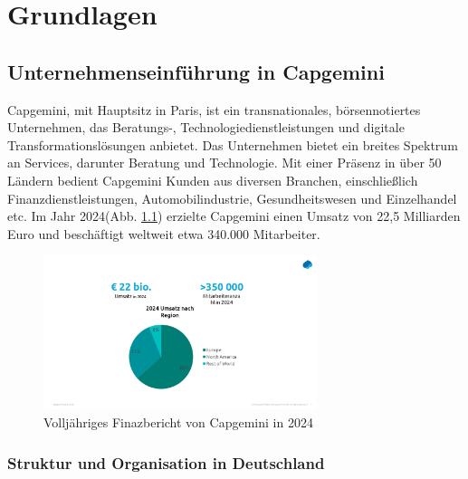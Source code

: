 \chapter{Grundlagen}
\section{Unternehmenseinführung in Capgemini} %
Capgemini, mit Hauptsitz in Paris, ist ein transnationales, börsennotiertes Unternehmen, das Beratungs-, Technologiedienstleistungen und digitale Transformationslösungen anbietet. Das Unternehmen bietet ein breites Spektrum an Services, darunter Beratung und Technologie. Mit einer Präsenz in über 50 Ländern bedient Capgemini Kunden aus diversen Branchen, einschließlich Finanzdienstleistungen, Automobilindustrie, Gesundheitswesen und Einzelhandel etc. Im Jahr 2024(Abb. \ref{Stand von Capgemini}) erzielte Capgemini einen Umsatz von 22,5 Milliarden Euro und beschäftigt weltweit etwa 340.000 Mitarbeiter.
\begin{figure}[h!]
	\begin{center}
		\includegraphics[width=8cm]{CApgemini zahlen.png}
		\caption{Volljähriges Finazbericht von Capgemini in 2024\cite{Capgemini_allgemein}}
		\label{Stand von Capgemini}
	\end{center}
\end{figure}
\subsection{Struktur und Organisation in Deutschland}

